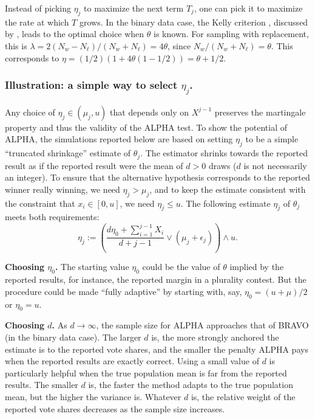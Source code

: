 \documentclass[12pt,runningheads]{llncs}
\begin{document}
{Instead of picking $\eta_j$ to maximize the next term $T_j$, one can pick it to maximize the rate at which $T$ grows.
In the binary data case, the Kelly criterion \cite{kelly56}, discussed by \cite{waudby-smithRamdas21}, leads to the
optimal choice when $\theta$ is known.
For sampling with replacement, this is $\lambda = 2(N_w-N_\ell)/(N_w+N_\ell) = 4\theta$, since $N_w/(N_w+N_\ell) = \theta$.
This corresponds to $\eta =  (1/2) \left ( 1 + 4\theta  (1-1/2) \right ) = \theta+1/2$. 

\subsubsection{Illustration: a simple way to select $\eta_j$.}
Any choice of $\eta_j \in (\mu_j, u)$ that depends only on $X^{j-1}$ preserves the martingale property and thus
the validity of the ALPHA test.
To show the potential of ALPHA, the simulations reported below are based on setting $\eta_j$ to be a simple 
``truncated shrinkage'' estimate of $\theta_j$.
The estimator shrinks towards the reported result as if the reported
result were the mean of 
$d>0$ draws ($d$ is not necessarily an integer). 
To ensure that the alternative hypothesis corresponds to the reported
winner really winning, we need $\eta_j > \mu_j$, and to keep the estimate consistent with the
constraint that $x_i \in [0, u]$, we need $\eta_j \le u$.
The following estimate $\eta_j$ of $\theta_j$ meets both requirements:
\begin{equation} \label{eq:etaDef}
\eta_j :=  \left ( \frac{d\eta_0 + \sum_{i=1}^{j-1}X_i }{d+j-1} \vee (\mu_j+\epsilon_j ) \right )
\wedge u.
\end{equation}

{\bf Choosing $\eta_0$.}
The starting value $\eta_0$ could be the value of $\theta$ implied by the reported results,
for instance, the reported margin in a plurality contest. 
But the procedure could be made ``fully adaptive'' by starting with,
say, $\eta_0 = (u+\mu)/2$ or $\eta_0 = u$.

{\bf Choosing $d$.}
As $d \rightarrow \infty$, the sample size for ALPHA approaches that of BRAVO (in the binary data case).
The larger $d$ is, the more strongly anchored the estimate is to the reported vote shares, and
the smaller the penalty ALPHA pays when the reported results are exactly correct.
Using a small value of $d$ is particularly helpful when the true population mean is far from the reported results.
The smaller $d$ is, the faster the method adapts to the true population mean, but the higher the variance is.
Whatever $d$ is, the relative weight of the reported vote shares decreases as the sample size increases.

}
\end{document}
